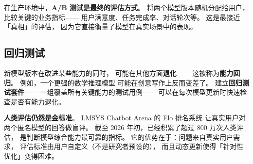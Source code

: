 在生产环境中，\textbf{A/B 测试是最终的评估方式}。
将两个模型版本随机分配给用户，
比较关键的业务指标——
用户满意度、任务完成率、对话轮次等。
这是最接近「真相」的评估，
因为它直接衡量了模型在真实场景中的表现。

\subsection{回归测试}

新模型版本在改进某些能力的同时，
可能在其他方面\textbf{退化}——
这被称为\textbf{能力回归}。
例如，一个更强的数学推理模型
可能在创意写作上反而变差了。
建立\textbf{回归测试套件}——
一组覆盖所有关键能力的测试用例——
可以在每次模型更新时快速检查是否有能力退化。

\textbf{人类评估仍然是金标准}。
LMSYS Chatbot Arena 的 Elo 排名系统
让真实用户对两个匿名模型的回答做盲评。
截至 2026 年初，已经积累了超过 800 万次人类评估，
是判断模型综合能力最可靠的指标。
它的优势在于：问题来自真实用户需求，
评估标准由用户自定义（不是研究者预设的），
而且动态更新使得「针对性优化」变得困难。



